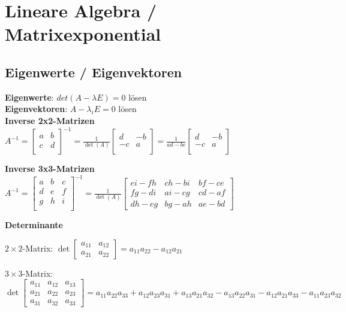 \newpage
\section{Lineare Algebra / Matrixexponential}
\subsection{Eigenwerte / Eigenvektoren}
\textbf{Eigenwerte}: $det(A-\lambda E) = 0$ lösen\\

\textbf{Eigenvektoren}: $A-\lambda_i E = 0$ lösen\\

\textbf{Inverse 2x2-Matrizen}\\
$A^{-1} = \begin{bmatrix}
a & b \\ c & d \\
\end{bmatrix}^{-1} =
\frac{1}{\det(A)} \begin{bmatrix}
d & -b \\ -c & a \\
\end{bmatrix}  =
\frac{1}{ad-bc} \begin{bmatrix}
d & -b \\ -c & a \\
\end{bmatrix}$

\textbf{Inverse 3x3-Matrizen}\\
$A^{-1} = \begin{bmatrix}
a & b & c\\ d & e & f \\ g & h & i \\
\end{bmatrix}^{-1} =
\frac{1}{\det(A)} \begin{bmatrix}
ei - fh & ch - bi & bf - ce \\
fg - di & ai - cg & cd - af \\
dh - eg & bg - ah & ae - bd
\end{bmatrix}$

\textbf{Determinante}

$2 \times 2$-Matrix:
$\det
 \begin{bmatrix}
 a_{11} & a_{12} \\
 a_{21} & a_{22}
 \end{bmatrix}
= a_{11} a_{22} - a_{12} a_{21}$

$3 \times 3$-Matrix:
$\det
 \begin{bmatrix}
 a_{11} & a_{12} & a_{13} \\
 a_{21} & a_{22} & a_{23} \\
 a_{31} & a_{32} & a_{33}
 \end{bmatrix} = a_{11} a_{22} a_{33} +a_{12} a_{23} a_{31} + a_{13} a_{21} a_{32} - a_{13} a_{22} a_{31} - a_{12} a_{21} a_{33} - a_{11} a_{23} a_{32}$

